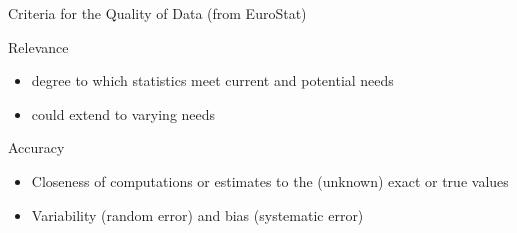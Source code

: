 \documentclass[xcolor=x11names,compress,8pt,
handout
]{beamer}
\renewcommand{\(}{\begin{columns}}
\renewcommand{\)}{\end{columns}}
\newcommand{\<}[1]{\begin{column}{#1}}
\renewcommand{\>}{\end{column}}
\begin{document}
\begin{frame}{Criteria for the Quality of Data (from EuroStat)}
\begin{alertblock}{Relevance}
\begin{itemize}
\item degree to which statistics meet current and potential  needs
\item could extend to varying needs
\end{itemize}
\end{alertblock}
\pause
\begin{alertblock}{Accuracy}
\begin{itemize}
\item Closeness of computations or estimates to the (unknown) exact or true values
\item Variability (random error) and bias (systematic error)

\end{itemize}
\end{alertblock}
\end{frame}
\end{document}
